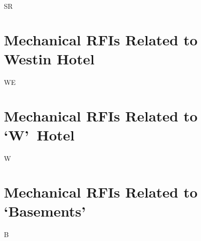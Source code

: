  {SR} 

\chapter {Mechanical RFIs Related to Westin Hotel}
 {WE}


\chapter{Mechanical RFIs Related to `W'~Hotel}
 {W}

\chapter{Mechanical RFIs Related to `Basements'  }
 {B}
  


